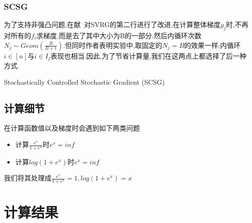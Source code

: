 \documentclass[UTF8]{ctexart}
\begin{document}
\subsubsection{SCSG}
为了支持非强凸问题,在献~\cite{lei2016less}对SVRG的第二行进行了改进,在计算整体梯度$g_j$时,不再对所有的$f_i$求梯度,而是去了其中大小为B的一部分.然后内循环次数$N_j\sim Geom(\frac{B}{B+1})$.但同时作者表明实验中,取固定的$N_j=B$的效果一样;内循环$i\in [n]$与$i \in I_j$表现也相当.因此,为了节省计算量,我们在这两点上都选择了后一种方式.
\begin{algorithm}
    \SetAlgoNoLine %

    \BlankLine

    \caption{Stochastically Controlled Stochastic Gradient (SCSG)\label{al3}}
\end{algorithm}

\subsection{计算细节}
在计算函数值以及梯度时会遇到如下两类问题
\begin{itemize}
  \item 计算$\frac{e^x}{1+e^x}$时$e^x=inf$
  \item 计算$log(1+e^x)$时$e^x=inf$
\end{itemize}
我们将其处理成$\frac{e^x}{1+e^x}=1,log(1+e^x)=x$
\section{计算结果}
\end{document}
